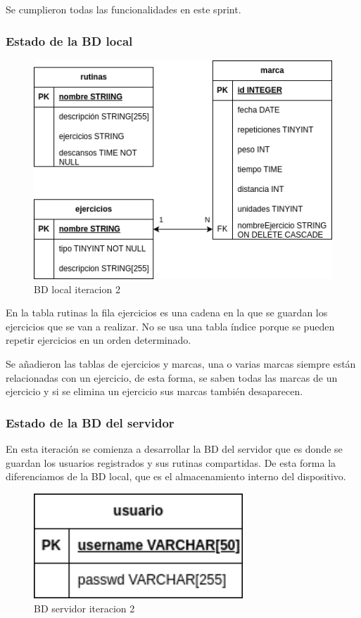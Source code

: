 Se cumplieron todas las funcionalidades en este sprint.

\subsubsection{Estado de la BD local}

\begin{figure}[H]
   \centering
    \includegraphics[width=\textwidth]{fotos/BDL iteracion 2.png}
    \caption{BD local iteracion 2}
    \label{fig:BD local iteracion 2}
\end{figure}

En la tabla rutinas la fila ejercicios es una cadena en la que se guardan los ejercicios que se van a realizar. No se usa una tabla índice porque se pueden repetir ejercicios en un orden determinado.

Se añadieron las tablas de ejercicios y marcas, una o varias marcas siempre están relacionadas con un ejercicio, de esta forma, se saben todas las marcas de un ejercicio y si se elimina un ejercicio sus marcas también desaparecen.

\subsubsection{Estado de la BD del servidor} 

En esta iteración se comienza a desarrollar la BD del servidor que es donde se guardan los usuarios registrados y sus rutinas compartidas. De esta forma la diferenciamos de la BD local, que es el almacenamiento interno del dispositivo.

\begin{figure}[H]
   \centering
    \includegraphics[width=0.7\textwidth]{fotos/BD be iteracion 2.png}
    \caption{BD servidor iteracion 2}
    \label{fig:BD backend iteracion 2}
\end{figure}

